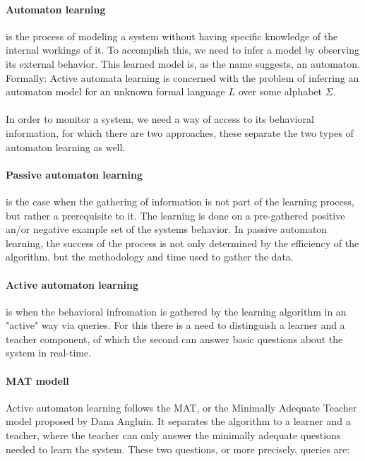 \paragraph{Automaton learning}  is the process of modeling a system without having specific knowledge of the internal workings of it. To accomplish this, we need to infer a model by observing its external behavior. This learned model is, as the name suggests, an automaton. 
\\Formally: Active  automata  learning is  concerned  with  the  problem  of  inferring  an automaton model for an unknown formal language $L$ over some alphabet $\Sigma$\cite{Howar2018}.
\\\\In order to monitor a system, we need a way of access to its behavioral information, for which there are two approaches, these separate the two types of automaton learning as well.

\paragraph{Passive automaton learning} is the case when the gathering of information is not part of the learning process, but rather a prerequisite to it. The learning is done on a pre-gathered positive an/or negative example set of the systems behavior. In passive automaton learning, the success of the process is not only determined by the efficiency of the algorithm, but the methodology and time used to gather the data.

\paragraph{Active automaton learning} is when the behavioral infromation is gathered by the learning algorithm in an "active" way via queries. For this there is a need to distinguish a learner and a teacher component, of which the second can answer basic questions about the system in real-time. 


\paragraph{MAT modell} Active automaton learning follows the MAT, or the Minimally Adequate Teacher model proposed by Dana Angluin\cite{ANGLUIN198787}. It separates the algorithm to a learner and a teacher, where the teacher can only answer the minimally adequate questions needed to learn the system. These two questions, or more precisely, queries are:


